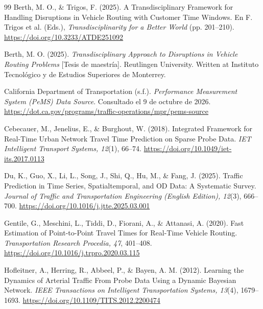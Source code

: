 \documentclass[11pt]{article}
\begin{document}
\begin{thebibliography}{99}
Berth, M. O., \& Trigos, F. (2025).
A Transdisciplinary Framework for Handling Disruptions in Vehicle Routing with Customer Time Windows. En F. Trigos et al. (Eds.),
\textit{Transdisciplinarity for a Better World} (pp. 201--210).
\url{https://doi.org/10.3233/ATDE251092}

Berth, M. O. (2025).
\textit{Transdisciplinary Approach to Disruptions in Vehicle Routing Problems} [Tesis de maestría]. Reutlingen University.
Written at Instituto Tecnológico y de Estudios Superiores de Monterrey.

California Department of Transportation (s.f.).
\textit{Performance Measurement System ({PeMS}) Data Source}. Consultado el 9 de octubre de 2026.
\url{https://dot.ca.gov/programs/traffic-operations/mpr/pems-source}

Cebecauer, M., Jenelius, E., \& Burghout, W. (2018).
Integrated Framework for Real-Time Urban Network Travel Time Prediction on Sparse Probe Data.
\textit{IET Intelligent Transport Systems, 12}(1), 66--74.
\url{https://doi.org/10.1049/iet-its.2017.0113}

Du, K., Guo, X., Li, L., Song, J., Shi, Q., Hu, M., \& Fang, J. (2025).
Traffic Prediction in Time Series, Spatialtemporal, and {OD} Data: A Systematic Survey.
\textit{Journal of Traffic and Transportation Engineering (English Edition), 12}(3), 666--700.
\url{https://doi.org/10.1016/j.jtte.2025.03.001}

Gentile, G., Meschini, L., Tiddi, D., Fiorani, A., \& Attanasi, A. (2020).
Fast Estimation of Point-to-Point Travel Times for Real-Time Vehicle Routing.
\textit{Transportation Research Procedia, 47}, 401--408.
\url{https://doi.org/10.1016/j.trpro.2020.03.115}

Hofleitner, A., Herring, R., Abbeel, P., \& Bayen, A. M. (2012).
Learning the Dynamics of Arterial Traffic From Probe Data Using a Dynamic Bayesian Network.
\textit{IEEE Transactions on Intelligent Transportation Systems, 13}(4), 1679--1693.
\url{https://doi.org/10.1109/TITS.2012.2200474}


\end{thebibliography}
\end{document}
